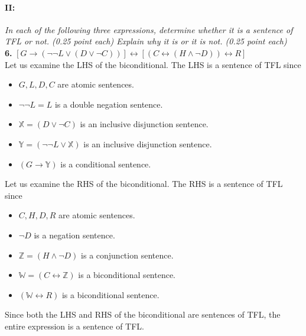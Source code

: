 \documentclass[a4paper,11pt]{article}
\theoremstyle{mytheor}
\let\biconditional\leftrightarrow
\begin{document}
\paragraph{II:} \textit{In each of the following three expressions, determine whether it is a sentence of TFL or not. (0.25 point each) Explain why it is or it is not. (0.25 point each)} \\[1em]
\textbf{6.} $[G \to (\neg \neg L \lor (D \lor \neg C))] \biconditional [(C \biconditional (H \land \neg D)) \biconditional R]$ \\
Let us examine the LHS of the biconditional. The LHS is a sentence of TFL since
\begin{itemize}
    \item $G, L, D, C$ are atomic sentences.
    \item $\neg \neg L = L$ is a double negation sentence.
    \item $\mathbb{X} = (D \lor \neg C)$ is an inclusive disjunction sentence.
    \item $\mathbb{Y} = (\neg \neg L \lor \mathbb{X})$ is an inclusive disjunction sentence.
    \item $(G \to \mathbb{Y})$ is a conditional sentence.
\end{itemize}
Let us examine the RHS of the biconditional. The RHS is a sentence of TFL since
\begin{itemize}
    \item $C, H, D, R$ are atomic sentences.
    \item $\neg D$ is a negation sentence.
    \item $\mathbb{Z} = (H \land \neg D)$ is a conjunction sentence.
    \item $\mathbb{W} = (C \biconditional \mathbb{Z})$ is a biconditional sentence.
    \item $(\mathbb{W} \biconditional R)$ is a biconditional sentence.
\end{itemize}
\begin{framed}
\noindent Since both the LHS and RHS of the biconditional are sentences of TFL, the entire expression is a sentence of TFL. 
\end{framed}
\end{document}
